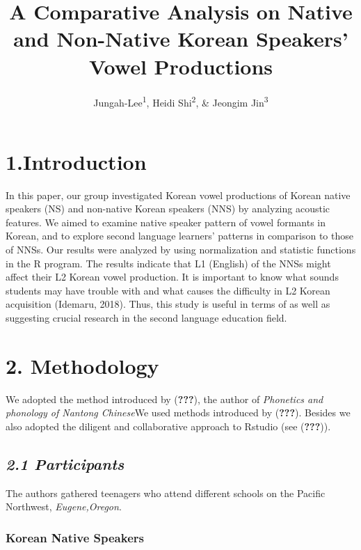 \documentclass[man, fleqn, noextraspace]{apa6}
\title{A Comparative Analysis on Native and Non-Native Korean Speakers' Vowel
Productions}
\author{Jungah-Lee\textsuperscript{1}, Heidi Shi\textsuperscript{2}, \& Jeongim
Jin\textsuperscript{3}}
\date{}
\affiliation{
\vspace{0.5cm}
\textsuperscript{1} University of Oregon\\\textsuperscript{2} University of Oregon\\\textsuperscript{3} University of Oregon}
\begin{document}
\maketitle

{
\setcounter{tocdepth}{4}
\tableofcontents
}
\newpage

\section{\texorpdfstring{\textbf{1.Introduction}}{1.Introduction}}\label{introduction}

In this paper, our group investigated Korean vowel productions of Korean
native speakers (NS) and non-native Korean speakers (NNS) by analyzing
acoustic features. We aimed to examine native speaker pattern of vowel
formants in Korean, and to explore second language learners' patterns in
comparison to those of NNSs. Our results were analyzed by using
normalization and statistic functions in the R program. The results
indicate that L1 (English) of the NNSs might affect their L2 Korean
vowel production. It is important to know what sounds students may have
trouble with and what causes the difficulty in L2 Korean acquisition
(Idemaru, 2018). Thus, this study is useful in terms of as well as
suggesting crucial research in the second language education field.

\section{\texorpdfstring{\textbf{2.
Methodology}}{2. Methodology}}\label{methodology}

We adopted the method introduced by ({\textbf{???}}), the author of
\emph{Phonetics and phonology of Nantong Chinese}We used methods
introduced by ({\textbf{???}}). Besides we also adopted the diligent and
collaborative approach to Rstudio (see ({\textbf{???}})).

\subsection{\texorpdfstring{\emph{2.1
Participants}}{2.1 Participants}}\label{participants}

The authors gathered teenagers who attend different schools on the
Pacific Northwest, \emph{Eugene,Oregon}.

\subsubsection{Korean Native Speakers}\label{korean-native-speakers}
\end{document}
